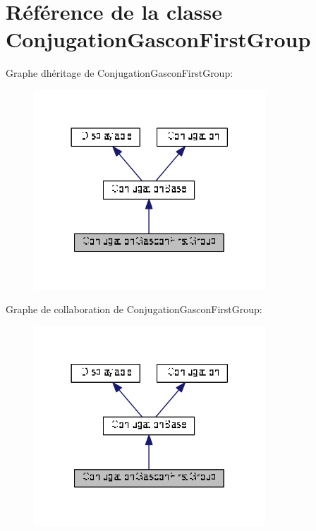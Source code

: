 \hypertarget{class_conjugation_gascon_first_group}{}\section{Référence de la classe Conjugation\+Gascon\+First\+Group}
\label{class_conjugation_gascon_first_group}


Graphe d\textquotesingle{}héritage de Conjugation\+Gascon\+First\+Group\+:
\nopagebreak
\begin{figure}[H]
\begin{center}
\leavevmode
\includegraphics[width=246pt]{class_conjugation_gascon_first_group__inherit__graph}
\end{center}
\end{figure}


Graphe de collaboration de Conjugation\+Gascon\+First\+Group\+:
\nopagebreak
\begin{figure}[H]
\begin{center}
\leavevmode
\includegraphics[width=246pt]{class_conjugation_gascon_first_group__coll__graph}
\end{center}
\end{figure}
